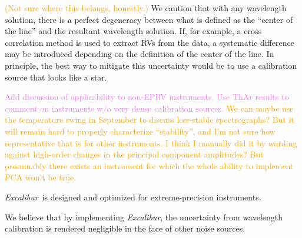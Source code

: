 \documentclass[modern]{aastex63}
\newcommand{\project}[1]{\textsl{#1}}
\newcommand{\name}{\project{Excalibur}}
\newcommand{\lz}[1]{\textcolor{orange}{#1}}
\newcommand{\mb}[1]{\textcolor{violet}{#1}}
\begin{document}
\lz{(Not sure where this belongs, honestly.)}  We caution that with any wavelength solution, there is a perfect degeneracy between what is defined as the ``center of the line'' and the resultant wavelength solution.  If, for example, a cross correlation method is used to extract RVs from the data, a systematic difference may be introduced depending on the definition of the center of the line.  In principle, the best way to mitigate this uncertainty would be to use a calibration source that looks like a star.

\mb{Add discussion of applicability to non-EPRV instruments.  Use ThAr results to comment on instruments w/o very dense calibration sources.}
\lz{We can maybe use the temperature swing in September to discuss less-stable spectrographs?  But it will remain hard to properly characterize ``stability'', and I'm not sure how representative that is for other instruments.  I think I manually did it by warding against high-order changes in the principal component amplitudes?  But presumably there exists an instrument for which the whole ability to implement PCA won't be true.}

\name\ is designed and optimized for extreme-precision instruments.  

We believe that by implementing \name, the uncertainty from wavelength calibration is rendered negligible in the face of other noise sources.





\end{document}
